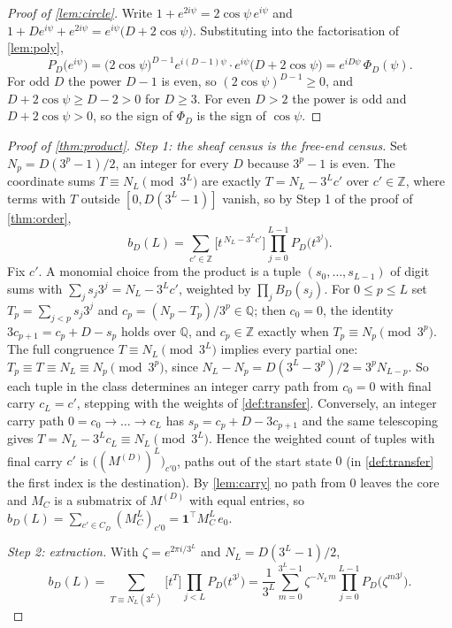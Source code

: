 \documentclass[11pt]{amsart}
\theoremstyle{definition}
\theoremstyle{remark}
\begin{document}
\begin{proof}[Proof of \cref{lem:circle}]
Write $1 + e^{2i\psi} = 2\cos\psi \, e^{i\psi}$ and $1 + De^{i\psi} + e^{2i\psi} = e^{i\psi}\bigl(D + 2\cos\psi\bigr)$. Substituting into the factorisation of \cref{lem:poly},
\[
P_D\bigl(e^{i\psi}\bigr) = \bigl(2\cos\psi\bigr)^{D-1} e^{i(D-1)\psi} \cdot e^{i\psi}\bigl(D + 2\cos\psi\bigr) = e^{iD\psi}\,\Phi_D(\psi).
\]
For odd $D$ the power $D-1$ is even, so $(2\cos\psi)^{D-1} \ge 0$, and $D + 2\cos\psi \ge D - 2 > 0$ for $D \ge 3$. For even $D > 2$ the power is odd and $D + 2\cos\psi > 0$, so the sign of $\Phi_D$ is the sign of $\cos\psi$.
\end{proof}

\begin{proof}[Proof of \cref{thm:product}]
\emph{Step 1: the sheaf census is the free-end census.} Set $N_p = D(3^p-1)/2$, an integer for every $D$ because $3^p - 1$ is even. The coordinate sums $T \equiv N_L \pmod{3^L}$ are exactly $T = N_L - 3^L c'$ over $c' \in \mathbb{Z}$, where terms with $T$ outside $[0, D(3^L-1)]$ vanish, so by Step 1 of the proof of \cref{thm:order},
\[
b_D(L) = \sum_{c' \in \mathbb{Z}} \bigl[t^{\,N_L - 3^L c'}\bigr] \prod_{j=0}^{L-1} P_D\bigl(t^{3^j}\bigr).
\]
Fix $c'$. A monomial choice from the product is a tuple $(s_0,\dots,s_{L-1})$ of digit sums with $\sum_j s_j 3^j = N_L - 3^L c'$, weighted by $\prod_j B_D(s_j)$. For $0 \le p \le L$ set $T_p = \sum_{j<p} s_j 3^j$ and $c_p = (N_p - T_p)/3^p \in \mathbb{Q}$; then $c_0 = 0$, the identity $3c_{p+1} = c_p + D - s_p$ holds over $\mathbb{Q}$, and $c_p \in \mathbb{Z}$ exactly when $T_p \equiv N_p \pmod{3^p}$. The full congruence $T \equiv N_L \pmod{3^L}$ implies every partial one: $T_p \equiv T \equiv N_L \equiv N_p \pmod{3^p}$, since $N_L - N_p = D(3^L - 3^p)/2 = 3^p N_{L-p}$. So each tuple in the class determines an integer carry path from $c_0 = 0$ with final carry $c_L = c'$, stepping with the weights of \cref{def:transfer}. Conversely, an integer carry path $0 = c_0 \to \dots \to c_L$ has $s_p = c_p + D - 3c_{p+1}$ and the same telescoping gives $T = N_L - 3^L c_L \equiv N_L \pmod{3^L}$. Hence the weighted count of tuples with final carry $c'$ is $\bigl((M^{(D)})^L\bigr)_{c'0}$, paths out of the start state $0$ (in \cref{def:transfer} the first index is the destination). By \cref{lem:carry} no path from $0$ leaves the core and $M_C$ is a submatrix of $M^{(D)}$ with equal entries, so $b_D(L) = \sum_{c' \in C_D} (M_C^L)_{c'0} = \mathbf{1}^{\top} M_C^L\, e_0$.

\emph{Step 2: extraction.} With $\zeta = e^{2\pi i/3^L}$ and $N_L = D(3^L-1)/2$,
\[
b_D(L) = \sum_{T \equiv N_L (3^L)} \bigl[t^T\bigr] \prod_{j<L} P_D\bigl(t^{3^j}\bigr)
= \frac{1}{3^L}\sum_{m=0}^{3^L-1} \zeta^{-N_L m} \prod_{j=0}^{L-1} P_D\bigl(\zeta^{m 3^j}\bigr).
\]


\end{proof}
\end{document}
